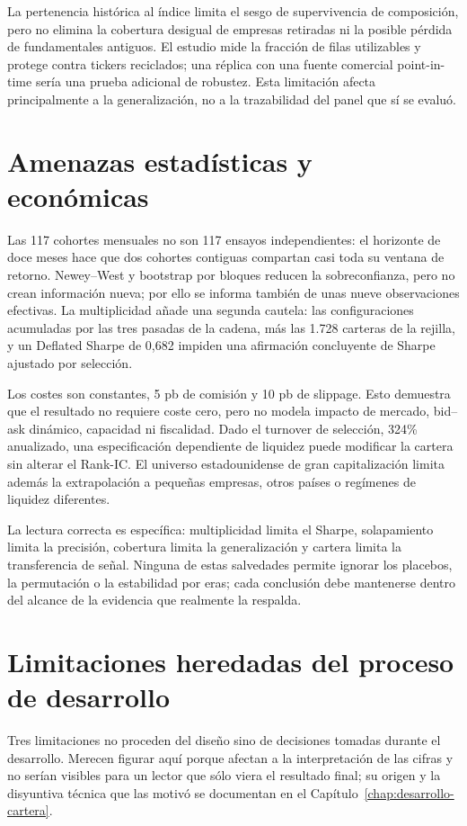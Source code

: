 La pertenencia histórica al índice limita el sesgo de supervivencia de composición, pero no elimina
la cobertura desigual de empresas retiradas ni la posible pérdida de fundamentales antiguos. El
estudio mide la fracción de filas utilizables y protege contra tickers reciclados; una réplica con
una fuente comercial point-in-time sería una prueba adicional de robustez. Esta limitación afecta
principalmente a la generalización, no a la trazabilidad del panel que sí se evaluó.

\section{Amenazas estadísticas y económicas}

Las 117 cohortes mensuales no son 117 ensayos independientes: el horizonte de doce meses hace que
dos cohortes contiguas compartan casi toda su ventana de retorno. Newey--West y bootstrap por bloques
reducen la sobreconfianza, pero no crean información nueva; por ello se informa también de unas
nueve observaciones efectivas. La multiplicidad añade una segunda cautela: las configuraciones
acumuladas por las tres pasadas de la cadena, más las 1.728 carteras de la rejilla, y un Deflated
Sharpe de 0,682 impiden una afirmación concluyente de Sharpe ajustado por selección.

Los costes son constantes, 5 pb de comisión y 10 pb de slippage. Esto demuestra que el resultado no
requiere coste cero, pero no modela impacto de mercado, bid--ask dinámico, capacidad ni fiscalidad.
Dado el turnover de selección, 324\% anualizado, una especificación dependiente de liquidez puede
modificar la cartera sin alterar el Rank-IC. El universo estadounidense de gran capitalización limita
además la extrapolación a pequeñas empresas, otros países o regímenes de liquidez diferentes.

La lectura correcta es específica: multiplicidad limita el Sharpe, solapamiento limita la precisión,
cobertura limita la generalización y cartera limita la transferencia de señal. Ninguna de estas
salvedades permite ignorar los placebos, la permutación o la estabilidad por eras; cada conclusión
debe mantenerse dentro del alcance de la evidencia que realmente la respalda.

\section{Limitaciones heredadas del proceso de desarrollo}

Tres limitaciones no proceden del diseño sino de decisiones tomadas durante el desarrollo. Merecen
figurar aquí porque afectan a la interpretación de las cifras y no serían visibles para un lector
que sólo viera el resultado final; su origen y la disyuntiva técnica que las motivó se documentan en
el Capítulo~\ref{chap:desarrollo-cartera}.

